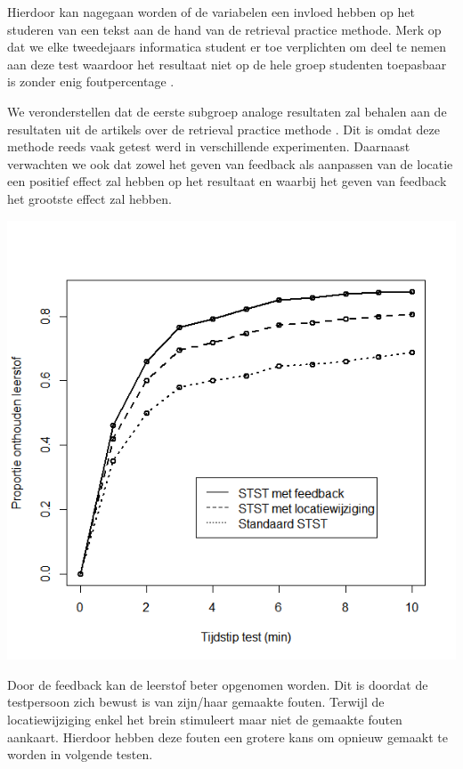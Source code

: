 \documentclass{hogent-article}
\begin{document}
    Hierdoor kan nagegaan worden of de variabelen een invloed hebben op het studeren van een tekst aan de hand van de retrieval practice methode. Merk op dat we elke tweedejaars informatica student er toe verplichten om deel te nemen aan deze test waardoor het resultaat niet op de hele groep studenten toepasbaar is zonder enig foutpercentage \autocite{karpicke2009metacognitive}.
    
    We veronderstellen dat de eerste subgroep analoge resultaten zal behalen aan de resultaten uit de artikels over de retrieval practice methode \autocite{butler2010repeated, pyc2012test, karpicke2007repeated, karpicke2008critical}. Dit is omdat deze methode reeds vaak getest werd in verschillende experimenten.
    Daarnaast verwachten we ook dat zowel het geven van feedback als aanpassen van de locatie een positief effect zal hebben op het resultaat en waarbij het geven van feedback het grootste effect zal hebben.
    
    \includegraphics[scale=0.5]{mockGrafiek1}
    
    Door de feedback kan de leerstof beter opgenomen worden. Dit is doordat de testpersoon zich bewust is van zijn/haar gemaakte fouten. Terwijl de locatiewijziging enkel het brein stimuleert maar niet de gemaakte fouten aankaart. Hierdoor hebben deze fouten een grotere kans om opnieuw gemaakt te worden in volgende testen.
    
	
	\printbibliography[heading=bibintoc]
	
\end{document}

